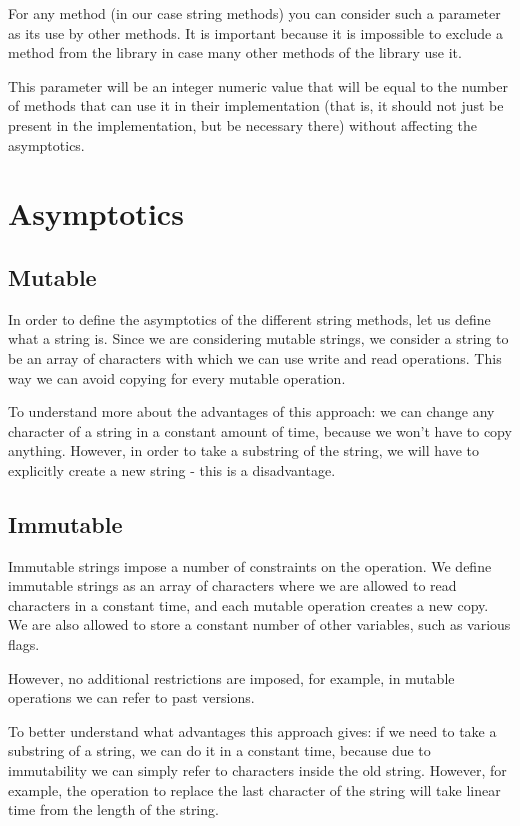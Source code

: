 \documentclass[anonymous,sigplan,review,11pt,nonacm,natbib=false]{acmart}
\begin{document}
For any method (in our case string methods) you can consider such a parameter as its use by other methods. It is important because it is impossible to exclude a method from the library in case many other methods of the library use it.

This parameter will be an integer numeric value that will be equal to the number of methods that can use it in their implementation (that is, it should not just be present in the implementation, but be necessary there) without affecting the asymptotics.

\section{Asymptotics}

\subsection{Mutable}

In order to define the asymptotics of the different string methods, let us define what a string is. Since we are considering mutable strings, we consider a string to be an array of characters with which we can use write and read operations. This way we can avoid copying for every mutable operation.

To understand more about the advantages of this approach: we can change any character of a string in a constant amount of time, because we won't have to copy anything. However, in order to take a substring of the string, we will have to explicitly create a new string - this is a disadvantage.

\subsection{Immutable}

Immutable strings impose a number of constraints on the operation. We define immutable strings as an array of characters where we are allowed to read characters in a constant time, and each mutable operation creates a new copy. We are also allowed to store a constant number of other variables, such as various flags.

However, no additional restrictions are imposed, for example, in mutable operations we can refer to past versions.

To better understand what advantages this approach gives: if we need to take a substring of a string, we can do it in a constant time, because due to immutability we can simply refer to characters inside the old string. However, for example, the operation to replace the last character of the string will take linear time from the length of the string.
\end{document}
